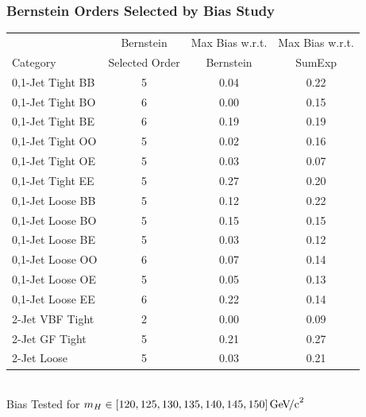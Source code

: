 \documentclass{beamer}
\newcommand{\GeVcc}{\ensuremath{\,\mathrm{Ge\kern -0.1em V\!/c}^2}}
\begin{document}
\begin{frame}
\frametitle{Bernstein Orders Selected by Bias Study}
  \begin{center}
    \scriptsize
    \begin{tabular}{|l|c|c|c|} \hline
                           & Bernstein                & Max Bias w.r.t. & Max Bias w.r.t. \\
Category                  & Selected Order      & Bernstein & SumExp \\ \hline \hline
0,1-Jet Tight BB& 5          &       0.04 &       0.22 \\ \hline
0,1-Jet Tight BO& 6          &       0.00 &       0.15 \\ \hline
0,1-Jet Tight BE& 6          &       0.19 &       0.19 \\ \hline
0,1-Jet Tight OO& 5          &       0.02 &       0.16 \\ \hline
0,1-Jet Tight OE& 5          &       0.03 &       0.07 \\ \hline
0,1-Jet Tight EE& 5          &       0.27 &       0.20 \\ \hline
0,1-Jet Loose BB& 5          &       0.12 &       0.22 \\ \hline
0,1-Jet Loose BO& 5          &       0.15 &       0.15 \\ \hline
0,1-Jet Loose BE& 5          &       0.03 &       0.12 \\ \hline
0,1-Jet Loose OO& 6          &       0.07 &       0.14 \\ \hline
0,1-Jet Loose OE& 5          &       0.05 &       0.13 \\ \hline
0,1-Jet Loose EE& 6          &       0.22 &       0.14 \\ \hline
2-Jet VBF Tight& 2          &       0.00 &       0.09 \\ \hline
2-Jet GF Tight & 5          &       0.21 &       0.27 \\ \hline
2-Jet Loose    & 5          &       0.03 &       0.21 \\ \hline
    \end{tabular}
\\
  \small
    Bias Tested for $m_H \in [120,125,130,135,140,145,150] \GeVcc$
  \end{center}
\end{frame}
\end{document}

